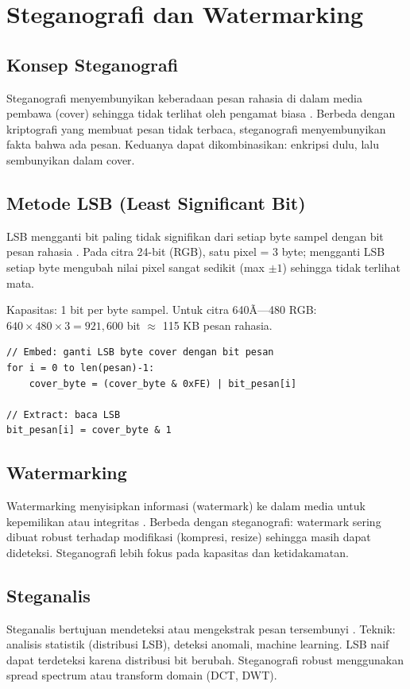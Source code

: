 ﻿\section{Steganografi dan Watermarking}

\subsection{Konsep Steganografi}

Steganografi menyembunyikan keberadaan pesan rahasia di dalam media pembawa (cover) sehingga tidak terlihat oleh pengamat biasa \cite{stallings2017}. Berbeda dengan kriptografi yang membuat pesan tidak terbaca, steganografi menyembunyikan fakta bahwa ada pesan. Keduanya dapat dikombinasikan: enkripsi dulu, lalu sembunyikan dalam cover.

\subsection{Metode LSB (Least Significant Bit)}

LSB mengganti bit paling tidak signifikan dari setiap byte sampel dengan bit pesan rahasia \cite{stallings2017}. Pada citra 24-bit (RGB), satu pixel = 3 byte; mengganti LSB setiap byte mengubah nilai pixel sangat sedikit (max $\pm 1$) sehingga tidak terlihat mata.

Kapasitas: 1 bit per byte sampel. Untuk citra 640Ã—480 RGB: $640 \times 480 \times 3 = 921{,}600$ bit $\approx$ 115 KB pesan rahasia.

\begin{lstlisting}[style=cstyle, caption={Prinsip LSB embedding (pseudocode)}]
// Embed: ganti LSB byte cover dengan bit pesan
for i = 0 to len(pesan)-1:
    cover_byte = (cover_byte & 0xFE) | bit_pesan[i]

// Extract: baca LSB
bit_pesan[i] = cover_byte & 1
\end{lstlisting}

\subsection{Watermarking}

Watermarking menyisipkan informasi (watermark) ke dalam media untuk kepemilikan atau integritas \cite{stallings2017}. Berbeda dengan steganografi: watermark sering dibuat robust terhadap modifikasi (kompresi, resize) sehingga masih dapat dideteksi. Steganografi lebih fokus pada kapasitas dan ketidakamatan.

\subsection{Steganalis}

Steganalis bertujuan mendeteksi atau mengekstrak pesan tersembunyi \cite{stallings2017}. Teknik: analisis statistik (distribusi LSB), deteksi anomali, machine learning. LSB naif dapat terdeteksi karena distribusi bit berubah. Steganografi robust menggunakan spread spectrum atau transform domain (DCT, DWT).
